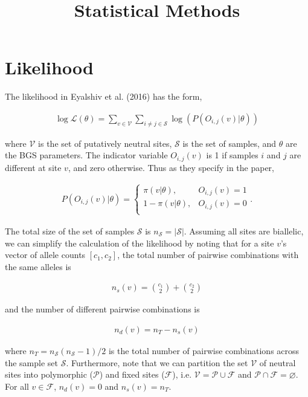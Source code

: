 \documentclass[11pt]{article}
\title{Statistical Methods}
\begin{document}
\maketitle


\section*{Likelihood}

The likelihood in Eyalshiv et al. (2016) has the form,

\begin{align}
  \log\mathcal{L}(\theta) = \sum_{v \in \mathcal{V}} \sum_{i \ne j \in \mathcal{S}} \log(P(O_{i,j}(v) | \theta))
\end{align}

where $\mathcal{V}$ is the set of putatively neutral sites, $\mathcal{S}$ is
the set of samples, and $\theta$ are the BGS parameters. The indicator variable
$O_{i,j}(v)$ is 1 if samples $i$ and $j$ are different at site $v$, and zero
otherwise. Thus as they specify in the paper, 

\begin{align}
  P(O_{i,j}(v) | \theta) = 
    \begin{cases}
      \pi(v | \theta), & O_{i,j}(v) = 1 \\
      1-\pi(v | \theta), & O_{i,j}(v) = 0 \\
    \end{cases}.
\end{align}

The total size of the set of samples $\mathcal{S}$ is $n_\mathcal{S} =
|\mathcal{S}|$. Assuming all sites are biallelic, we can simplify the
calculation of the likelihood by noting that for a site $v$'s vector of allele
counts $[c_1, c_2]$, the total number of pairwise combinations with the same
alleles is

\begin{align}
  n_s(v) = {c_1 \choose 2} + {c_2 \choose 2}
\end{align}

and the number of different pairwise combinations is 

\begin{align}
  n_d(v) = n_T - n_s(v)
\end{align}

where $n_T = n_\mathcal{S} (n_\mathcal{S} - 1) / 2$  is the total number of
pairwise combinations across the sample set $\mathcal{S}$. Furthermore, note
that we can partition the set $\mathcal{V}$ of neutral sites into polymorphic
($\mathcal{P}$) and fixed sites ($\mathcal{F}$), i.e. $\mathcal{V} =
\mathcal{P} \cup \mathcal{F}$ and $\mathcal{P} \cap \mathcal{F} = \varnothing$.
For all $v \in \mathcal{F}$, $n_d(v) = 0$ and $n_s(v) = n_T$.
\end{document}

